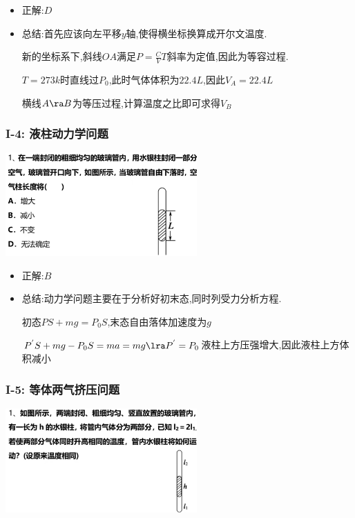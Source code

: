 \documentclass{article}
\begin{document}
\begin{itemize}
    \item 正解:\quad $D$
    \item 总结:\quad 首先应该向左平移$y$轴,使得横坐标换算成开尔文温度.

          \hspace{3.3em}新的坐标系下,斜线$OA$满足$P = \frac{C}{V}T$斜率为定值,因此为等容过程.

          \hspace{3.3em}$T = 273k$时直线过$P_{0}$,此时气体体积为$22.4L$,因此$V_{A} = 22.4L$
          
          \hspace{3.3em}横线$A \ra B$为等压过程,计算温度之比即可求得$V_{B}$
\end{itemize}

\vspace{2em}

\subsubsection{I-4: 液柱动力学问题}
\includegraphics[width = 0.55\textwidth,keepaspectratio]{./pictures/2.3-4.png}

\begin{itemize}
    \item 正解:\quad $B$
    \item 总结:\quad 动力学问题主要在于分析好初末态,同时列受力分析方程.

          \hspace{3.3em}初态$PS + mg = P_{0}S$,末态自由落体加速度为$g$

          \hspace{3.3em}$P^{'}S + mg - P_{0}S = ma = mg \lra P^{'} = P_{0}$液柱上方压强增大,因此液柱上方体积减小
\end{itemize}

\vspace{2em}

\subsubsection{I-5: 等体两气挤压问题}
\includegraphics[width = 0.55\textwidth,keepaspectratio]{./pictures/2.3-5.png}
\end{document}
